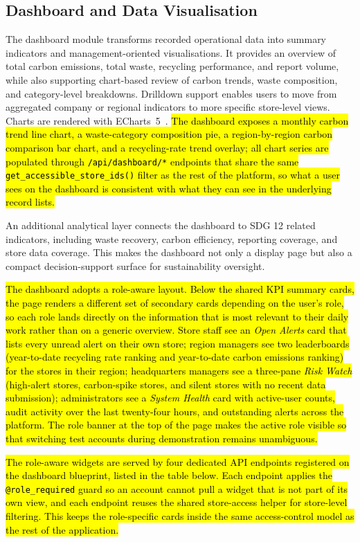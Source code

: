 \documentclass[11pt,a4paper]{article}
\newcommand{\new}[1]{\hl{#1}}
\begin{document}
\subsection{Dashboard and Data Visualisation}
The dashboard module transforms recorded operational data into summary indicators and management-oriented visualisations. It provides an overview of total carbon emissions, total waste, recycling performance, and report volume, while also supporting chart-based review of carbon trends, waste composition, and category-level breakdowns. Drilldown support enables users to move from aggregated company or regional indicators to more specific store-level views. Charts are rendered with ECharts~5~\cite{echarts}. \new{The dashboard exposes a monthly carbon trend line chart, a waste-category composition pie, a region-by-region carbon comparison bar chart, and a recycling-rate trend overlay; all chart series are populated through \texttt{/api/dashboard/*} endpoints that share the same \texttt{get\_accessible\_store\_ids()} filter as the rest of the platform, so what a user sees on the dashboard is consistent with what they can see in the underlying record lists.}

An additional analytical layer connects the dashboard to SDG 12 related indicators, including waste recovery, carbon efficiency, reporting coverage, and store data coverage. This makes the dashboard not only a display page but also a compact decision-support surface for sustainability oversight.

\new{The dashboard adopts a role-aware layout. Below the shared KPI summary cards, the page renders a different set of secondary cards depending on the user's role, so each role lands directly on the information that is most relevant to their daily work rather than on a generic overview. Store staff see an \emph{Open Alerts} card that lists every unread alert on their own store; region managers see two leaderboards (year-to-date recycling rate ranking and year-to-date carbon emissions ranking) for the stores in their region; headquarters managers see a three-pane \emph{Risk Watch} (high-alert stores, carbon-spike stores, and silent stores with no recent data submission); administrators see a \emph{System Health} card with active-user counts, audit activity over the last twenty-four hours, and outstanding alerts across the platform. The role banner at the top of the page makes the active role visible so that switching test accounts during demonstration remains unambiguous.}

\new{The role-aware widgets are served by four dedicated API endpoints registered on the dashboard blueprint, listed in the table below. Each endpoint applies the \texttt{@role\_required} guard so an account cannot pull a widget that is not part of its own view, and each endpoint reuses the shared store-access helper for store-level filtering. This keeps the role-specific cards inside the same access-control model as the rest of the application.}
\end{document}

